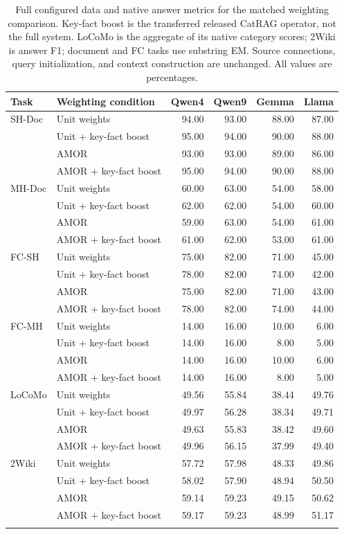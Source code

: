\begin{table}[t]
\centering
\small
\begin{tabular}{llrrrr}
\toprule
Task & Weighting condition & Qwen4 & Qwen9 & Gemma & Llama \\
\midrule
SH-Doc & Unit weights & 94.00 & 93.00 & 88.00 & 87.00 \\
 & Unit + key-fact boost & 95.00 & 94.00 & 90.00 & 88.00 \\
 & AMOR & 93.00 & 93.00 & 89.00 & 86.00 \\
 & AMOR + key-fact boost & 95.00 & 94.00 & 90.00 & 88.00 \\
\addlinespace[3pt]
MH-Doc & Unit weights & 60.00 & 63.00 & 54.00 & 58.00 \\
 & Unit + key-fact boost & 62.00 & 62.00 & 54.00 & 60.00 \\
 & AMOR & 59.00 & 63.00 & 54.00 & 61.00 \\
 & AMOR + key-fact boost & 61.00 & 62.00 & 53.00 & 61.00 \\
\addlinespace[3pt]
FC-SH & Unit weights & 75.00 & 82.00 & 71.00 & 45.00 \\
 & Unit + key-fact boost & 78.00 & 82.00 & 74.00 & 42.00 \\
 & AMOR & 75.00 & 82.00 & 71.00 & 43.00 \\
 & AMOR + key-fact boost & 78.00 & 82.00 & 74.00 & 44.00 \\
\addlinespace[3pt]
FC-MH & Unit weights & 14.00 & 16.00 & 10.00 & 6.00 \\
 & Unit + key-fact boost & 14.00 & 16.00 & 8.00 & 5.00 \\
 & AMOR & 14.00 & 16.00 & 10.00 & 6.00 \\
 & AMOR + key-fact boost & 14.00 & 16.00 & 8.00 & 5.00 \\
\addlinespace[3pt]
LoCoMo & Unit weights & 49.56 & 55.84 & 38.44 & 49.76 \\
 & Unit + key-fact boost & 49.97 & 56.28 & 38.34 & 49.71 \\
 & AMOR & 49.63 & 55.83 & 38.42 & 49.60 \\
 & AMOR + key-fact boost & 49.96 & 56.15 & 37.99 & 49.40 \\
\addlinespace[3pt]
2Wiki & Unit weights & 57.72 & 57.98 & 48.33 & 49.86 \\
 & Unit + key-fact boost & 58.02 & 57.90 & 48.94 & 50.50 \\
 & AMOR & 59.14 & 59.23 & 49.15 & 50.62 \\
 & AMOR + key-fact boost & 59.17 & 59.23 & 48.99 & 51.17 \\
\addlinespace[3pt]
\bottomrule
\end{tabular}
\caption{Full configured data and native answer metrics for the matched weighting comparison. Key-fact boost is the transferred released CatRAG operator, not the full system. LoCoMo is the aggregate of its native category scores; 2Wiki is answer F1; document and FC tasks use substring EM. Source connections, query initialization, and context construction are unchanged. All values are percentages.}
\label{tab:weighting-answers}
\end{table}
